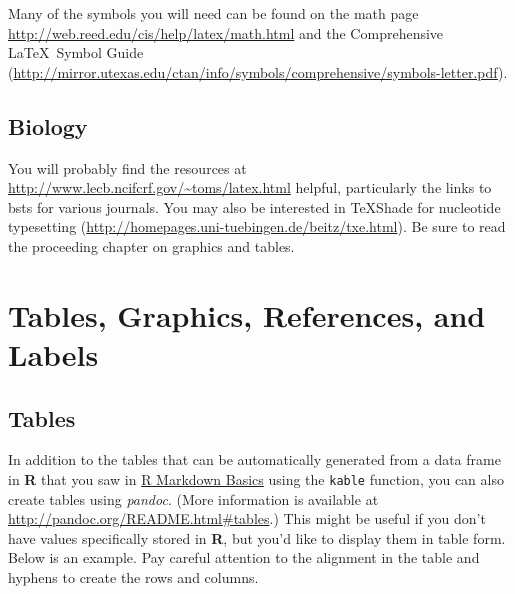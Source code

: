 \documentclass[12pt,twoside]{reedthesis}
\begin{document}
  Many of the symbols you will need can be found on the math page
  \url{http://web.reed.edu/cis/help/latex/math.html} and the Comprehensive
  \LaTeX~Symbol Guide
  (\url{http://mirror.utexas.edu/ctan/info/symbols/comprehensive/symbols-letter.pdf}).
  
  \section{Biology}\label{biology}
  
  You will probably find the resources at
  \url{http://www.lecb.ncifcrf.gov/~toms/latex.html} helpful, particularly
  the links to bsts for various journals. You may also be interested in
  TeXShade for nucleotide typesetting
  (\url{http://homepages.uni-tuebingen.de/beitz/txe.html}). Be sure to
  read the proceeding chapter on graphics and tables.
  
  \chapter{Tables, Graphics, References, and Labels}\label{ref-labels}
  
  \section{Tables}\label{tables}
  
  In addition to the tables that can be automatically generated from a
  data frame in \textbf{R} that you saw in
  \protect\hyperlink{rmd-basics}{R Markdown Basics} using the
  \texttt{kable} function, you can also create tables using \emph{pandoc}.
  (More information is available at
  \url{http://pandoc.org/README.html\#tables}.) This might be useful if
  you don't have values specifically stored in \textbf{R}, but you'd like
  to display them in table form. Below is an example. Pay careful
  attention to the alignment in the table and hyphens to create the rows
  and columns.
  
\end{document}
